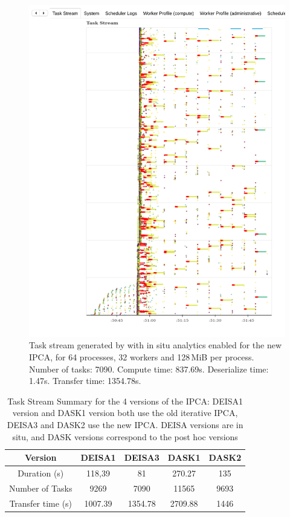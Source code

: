 \begin{figure}[h!]\centering
\includegraphics[width=\columnwidth]{figures/P64_W32_D128_DEISA3_IPCA.pdf}
\caption{Task stream generated by \dask with in situ analytics enabled for the new IPCA, for 64 processes, 32 workers and 128\,MiB per process.
    Number of tasks: 7090.
    Compute time: 837.69s.
    Deserialize time: 1.47s.
    Transfer time: 1354.78s.
}
\label{fig:taskstreamdeisa3}
\end{figure}


\begin{table}[ht]\centering
\begin{tabular}{||ccccc||}
\hline
Version               & DEISA1   & DEISA3   & DASK1        & DASK2     \\
\hline\hline
Duration (s)           & 118,39   & 81       & 270.27     &  135       \\
Number of Tasks        & 9269     & 7090     & 11565      &  9693      \\
Transfer time  (s)     & 1007.39  & 1354.78  & 2709.88    &  1446      \\
\hline\hline
\end{tabular}
\caption{\label{tab:taskStrem} Task Stream Summary for the 4 versions of the IPCA: DEISA1 version and DASK1 version both use the old iterative IPCA, DEISA3 and DASK2 use the new IPCA. DEISA versions are in situ, and DASK versions correspond to the post hoc versions}
\end{table}

